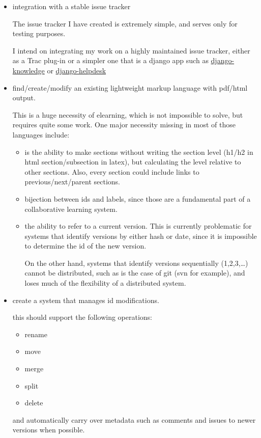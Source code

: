 \documentclass[12pt]{article}
\begin{document}
\begin{itemize}
  \item integration with a stable issue tracker
  
    The issue tracker I have created is extremely simple, and serves
    only for testing purposes.
    
    I intend on integrating my work on a highly maintained issue tracker,
    either as a Trac plug-in or a simpler one that is a django app such as
    \href{http://www.djangopackages.com/packages/p/django-knowledge/}{django-knowledge}
    or \href{http://www.djangopackages.com/packages/p/django-helpdesk/}{django-helpdesk}  
  
  \item find/create/modify an existing lightweight markup language with pdf/html output.

    This is a huge necessity of elearning, which is not impossible to solve, but requires
    quite some work. One major necessity missing in most of those languages include:
    
    \begin{itemize}   
	    \item is the ability to make sections
	      without writing the section level (h1/h2 in html section/subsection in latex), but calculating
	      the level relative to other sections. Also, every section could include links to previous/next/parent sections.
	    
	    \item bijection between ids and labels, since those are
	      a fundamental part of a collaborative learning system.
	      
	    \item the ability to refer to a current version. This is currently problematic for systems
	      that identify versions by either hash or date, since it is impossible to determine the id
	      of the new version.
	      
	      On the other hand, systems that identify versions sequentially (1,2,3,\ldots) cannot be distributed,
	      such as is the case of git (svn for example), and loses much of the flexibility of a distributed system.
	      
    \end{itemize}

  \item create a system that manages id modifications.
  
    this should support the following operations:
    
    \begin{itemize}
      \item rename
      \item move
      \item merge
      \item split
      \item delete
    \end{itemize}
    
    and automatically carry over metadata such as comments and issues to newer versions when possible.
    
\end{itemize}
\end{document}
